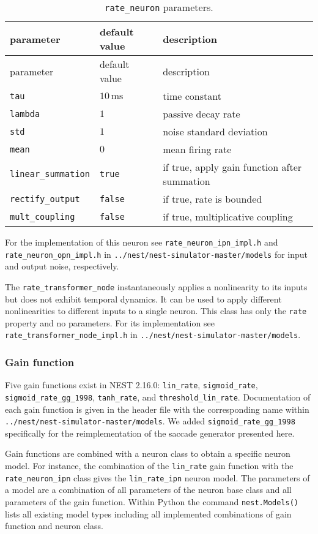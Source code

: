 \documentclass[10pt,a4paper,onecolumn]{article}
\begin{document}
\begin{longtable}[]{@{}lll@{}}
\caption{\texttt{rate\_neuron} parameters.
\label{tbl:table_2}}\tabularnewline
\toprule
parameter & default value & description\tabularnewline
\midrule
\endfirsthead
\toprule
parameter & default value & description\tabularnewline
\midrule
\endhead
\texttt{tau} & \(10\,\mathrm{ms}\) & time constant\tabularnewline
\texttt{lambda} & \(1\) & passive decay rate\tabularnewline
\texttt{std} & \(1\) & noise standard deviation\tabularnewline
\texttt{mean} & \(0\) & mean firing rate\tabularnewline
\texttt{linear\_summation} & \texttt{true} & if true, apply gain
function after summation\tabularnewline
\texttt{rectify\_output} & \texttt{false} & if true, rate is
bounded\tabularnewline
\texttt{mult\_coupling} & \texttt{false} & if true, multiplicative
coupling\tabularnewline
\bottomrule
\end{longtable}

For the implementation of this neuron see
\texttt{rate\_neuron\_ipn\_impl.h} and\\
\texttt{rate\_neuron\_opn\_impl.h} in
\texttt{../nest/nest-simulator-master/models} for input and output
noise, respectively.

The \texttt{rate\_transformer\_node} instantaneously applies a
nonlinearity to its inputs but does not exhibit temporal dynamics. It
can be used to apply different nonlinearities to different inputs to a
single neuron. This class has only the \texttt{rate} property and no
parameters. For its implementation see
\texttt{rate\_transformer\_node\_impl.h} in
\texttt{../nest/nest-simulator-master/models}.

\hypertarget{gain-function}{%
\subsubsection{Gain function}\label{gain-function}}

Five gain functions exist in NEST 2.16.0: \texttt{lin\_rate},
\texttt{sigmoid\_rate},\\
\texttt{sigmoid\_rate\_gg\_1998}, \texttt{tanh\_rate}, and
\texttt{threshold\_lin\_rate}. Documentation of each gain function is
given in the header file with the corresponding name within
\texttt{../nest/nest-simulator-master/models}. We added
\texttt{sigmoid\_rate\_gg\_1998} specifically for the reimplementation
of the saccade generator presented here.

Gain functions are combined with a neuron class to obtain a specific
neuron model. For instance, the combination of the \texttt{lin\_rate}
gain function with the \texttt{rate\_neuron\_ipn} class gives the
\texttt{lin\_rate\_ipn} neuron model. The parameters of a model are a
combination of all parameters of the neuron base class and all
parameters of the gain function. Within Python the command
\texttt{nest.Models()} lists all existing model types including all
implemented combinations of gain function and neuron class.

{\sffamily \small
  \printbibliography[title=References]
}
\end{document}
